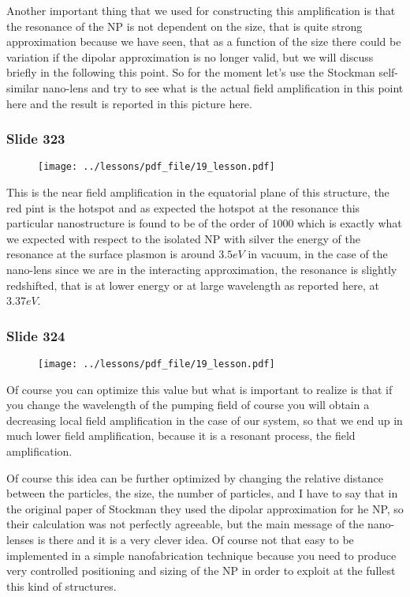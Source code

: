 \documentclass[../main/main.tex]{subfiles}
\begin{document}
Another important thing that we used for constructing this amplification is that the resonance of the NP is not dependent on the size, that is quite strong approximation because we have seen, that as a function of the size there could be variation if the dipolar approximation is no longer valid, but we will discuss briefly in the following this point. So for the moment let's use the Stockman self-similar nano-lens and try to see what is the actual field amplification in this point here and the result is reported in this picture here.

\newpage

\subsubsection{Slide 323}

\begin{figure}[h!]
\centering
\texttt{[image: ../lessons/pdf\_file/19\_lesson.pdf]}
\end{figure}

This is the near field amplification in the equatorial plane of this structure, the red pint is the hotspot and as expected the hotspot at the resonance this particular nanostructure is found to be of the order of $1000$ which is exactly what we expected with respect to the isolated NP with silver the energy of the resonance at the surface plasmon is around $3.5 eV$ in vacuum, in the case of the nano-lens since we are in the interacting approximation, the resonance is slightly redshifted, that is at lower energy or at large wavelength as reported here, at $3.37 eV$. 

\newpage
\subsubsection{Slide 324}

\begin{figure}[h!]
\centering
\texttt{[image: ../lessons/pdf\_file/19\_lesson.pdf]}
\end{figure}

Of course you can optimize this value but what is important to realize is that if you change the wavelength of the pumping field of course you will obtain a decreasing local field amplification in the case of our system, so that we end up in much lower field amplification, because it is a resonant process, the field amplification.

Of course this idea can be further optimized by changing the relative distance between the particles, the size, the number of particles, and I have to say that in the original paper of Stockman they used the dipolar approximation for he NP, so their calculation was not perfectly agreeable, but the main message of the nano-lenses is there and it is a very clever idea. Of course not that easy to be implemented in a simple nanofabrication technique because you need to produce very controlled positioning and sizing of the NP in order to exploit at the fullest this kind of structures.
\end{document}
